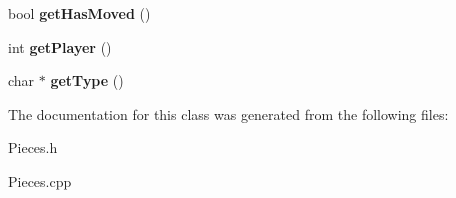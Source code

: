 \begin{DoxyCompactItemize}
\item 
\hypertarget{class_piece_ab1aefb3821698fb08fd6eafd5e4c8f5a}{bool {\bfseries get\-Has\-Moved} ()}\label{class_piece_ab1aefb3821698fb08fd6eafd5e4c8f5a}

\item 
\hypertarget{class_piece_acc0b7c99053c361cd55f0231e3b6e272}{int {\bfseries get\-Player} ()}\label{class_piece_acc0b7c99053c361cd55f0231e3b6e272}

\item 
\hypertarget{class_piece_a39392c919bff7c404cc05b6b31e6bf32}{char $\ast$ {\bfseries get\-Type} ()}\label{class_piece_a39392c919bff7c404cc05b6b31e6bf32}

\end{DoxyCompactItemize}


The documentation for this class was generated from the following files\-:\begin{DoxyCompactItemize}
\item 
Pieces.\-h\item 
Pieces.\-cpp\end{DoxyCompactItemize}
